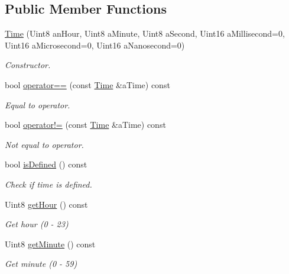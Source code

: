 \subsection*{Public Member Functions}
\begin{DoxyCompactItemize}
\item 
\hyperlink{classlibrary_1_1physics_1_1time_1_1_time_a46a4b9be1451041ae65332f04db21c4b}{Time} (Uint8 an\+Hour, Uint8 a\+Minute, Uint8 a\+Second, Uint16 a\+Millisecond=0, Uint16 a\+Microsecond=0, Uint16 a\+Nanosecond=0)
\begin{DoxyCompactList}\small\item\em Constructor. \end{DoxyCompactList}\item 
bool \hyperlink{classlibrary_1_1physics_1_1time_1_1_time_ac566f208b63b58b5dae1328b4c24fbe6}{operator==} (const \hyperlink{classlibrary_1_1physics_1_1time_1_1_time}{Time} \&a\+Time) const
\begin{DoxyCompactList}\small\item\em Equal to operator. \end{DoxyCompactList}\item 
bool \hyperlink{classlibrary_1_1physics_1_1time_1_1_time_af2caee50ce2d4abd157645052a090db1}{operator!=} (const \hyperlink{classlibrary_1_1physics_1_1time_1_1_time}{Time} \&a\+Time) const
\begin{DoxyCompactList}\small\item\em Not equal to operator. \end{DoxyCompactList}\item 
bool \hyperlink{classlibrary_1_1physics_1_1time_1_1_time_a45736fe7072e922a9d9c3829c7517b88}{is\+Defined} () const
\begin{DoxyCompactList}\small\item\em Check if time is defined. \end{DoxyCompactList}\item 
Uint8 \hyperlink{classlibrary_1_1physics_1_1time_1_1_time_a3744d684384aabf0122dcac098e480fa}{get\+Hour} () const
\begin{DoxyCompactList}\small\item\em Get hour (0 -\/ 23) \end{DoxyCompactList}\item 
Uint8 \hyperlink{classlibrary_1_1physics_1_1time_1_1_time_a322ff06ee6674a14331848b9960dfaff}{get\+Minute} () const
\begin{DoxyCompactList}\small\item\em Get minute (0 -\/ 59) \end{DoxyCompactList}\item 

\end{DoxyCompactItemize}
